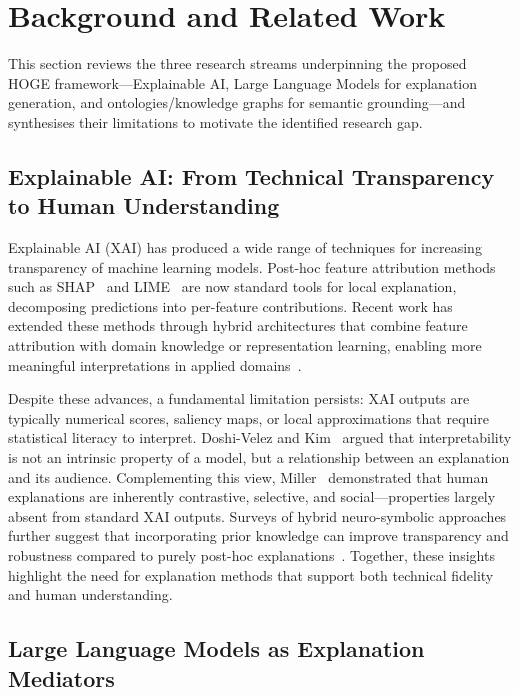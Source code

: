 \documentclass[lnbip]{svmultln}
\begin{document}
\section{Background and Related Work}

This section reviews the three research streams underpinning the proposed HOGE framework---Explainable AI, Large Language Models for explanation generation, and ontologies/knowledge graphs for semantic grounding---and synthesises their limitations to motivate the identified research gap.

\subsection{Explainable AI: From Technical Transparency to Human Understanding}

Explainable AI (XAI) has produced a wide range of techniques for increasing transparency of machine learning models. Post-hoc feature attribution methods such as SHAP~\cite{lundberg2017} and LIME~\cite{ribeiro2016} are now standard tools for local explanation, decomposing predictions into per-feature contributions. Recent work has extended these methods through hybrid architectures that combine feature attribution with domain knowledge or representation learning, enabling more meaningful interpretations in applied domains~\cite{dti2025,ncd2025}.

Despite these advances, a fundamental limitation persists: XAI outputs are typically numerical scores, saliency maps, or local approximations that require statistical literacy to interpret. Doshi-Velez and Kim~\cite{doshi2017} argued that interpretability is not an intrinsic property of a model, but a relationship between an explanation and its audience. Complementing this view, Miller~\cite{miller2019} demonstrated that human explanations are inherently contrastive, selective, and social---properties largely absent from standard XAI outputs. Surveys of hybrid neuro-symbolic approaches further suggest that incorporating prior knowledge can improve transparency and robustness compared to purely post-hoc explanations~\cite{priork2024}. Together, these insights highlight the need for explanation methods that support both technical fidelity and human understanding.

\subsection{Large Language Models as Explanation Mediators}
\end{document}
